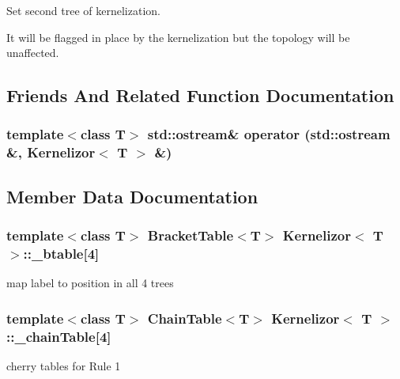 Set second tree of kernelization. 

It will be flagged in place by the kernelization but the topology will be unaffected. 

\subsection{Friends And Related Function Documentation}
\subsubsection{\setlength{\rightskip}{0pt plus 5cm}template$<$class T$>$ std::ostream\& operator (std::ostream \&, {\bf Kernelizor}$<$ T $>$ \&)\hspace{0.3cm}{\tt  [friend]}}\label{classKernelizor_n0}




\subsection{Member Data Documentation}
\subsubsection{\setlength{\rightskip}{0pt plus 5cm}template$<$class T$>$ {\bf Bracket\-Table}$<$T$>$ {\bf Kernelizor}$<$ T $>$::{\bf \_\-btable}[4]\hspace{0.3cm}{\tt  [protected]}}\label{classKernelizor_p5}


map label to position in all 4 trees 

\subsubsection{\setlength{\rightskip}{0pt plus 5cm}template$<$class T$>$ {\bf Chain\-Table}$<$T$>$ {\bf Kernelizor}$<$ T $>$::{\bf \_\-chain\-Table}[4]\hspace{0.3cm}{\tt  [protected]}}\label{classKernelizor_p8}


cherry tables for Rule 1 

